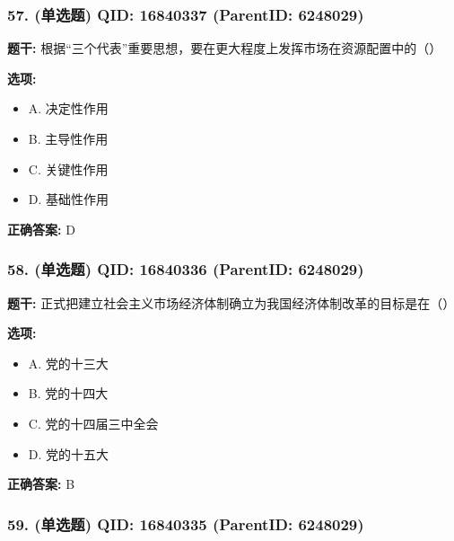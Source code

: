 \documentclass[12pt,UTF8]{ctexart}
\begin{document}
\subsubsection*{57. (单选题) \small QID: 16840337 (ParentID: 6248029)}

\textbf{题干:}
根据“三个代表”重要思想，要在更大程度上发挥市场在资源配置中的（）



\textbf{选项:}
\begin{itemize}[leftmargin=*]

  \item A. 决定性作用

  \item B. 主导性作用

  \item C. 关键性作用

  \item D. 基础性作用

\end{itemize}

\textbf{正确答案:}
D

\vspace{0.3em}\hrulefill\vspace{0.7em}

\subsubsection*{58. (单选题) \small QID: 16840336 (ParentID: 6248029)}

\textbf{题干:}
正式把建立社会主义市场经济体制确立为我国经济体制改革的目标是在（）



\textbf{选项:}
\begin{itemize}[leftmargin=*]

  \item A. 党的十三大

  \item B. 党的十四大

  \item C. 党的十四届三中全会

  \item D. 党的十五大

\end{itemize}

\textbf{正确答案:}
B

\vspace{0.3em}\hrulefill\vspace{0.7em}

\subsubsection*{59. (单选题) \small QID: 16840335 (ParentID: 6248029)}
\end{document}
